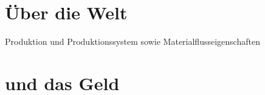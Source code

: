 \documentclass{article}
\begin{document}
\section*{Über die Welt}

Produktion und Produktionssystem sowie Materialflusseigenschaften

\section*{und das Geld}
\end{document}
